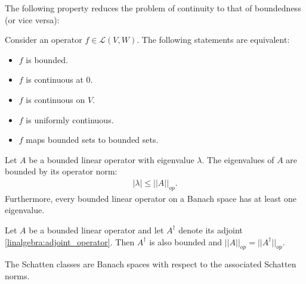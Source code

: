     The following property reduces the problem of continuity to that of boundedness (or vice versa):
    \begin{property}\label{operator:bounded_continuous}
        Consider an operator $f\in\mathcal{L}(V, W)$. The following statements are equivalent:
        \begin{itemize}
            \item $f$ is bounded.
            \item $f$ is continuous at 0.
            \item $f$ is continuous on $V$.
            \item $f$ is uniformly continuous.
            \item $f$ maps bounded sets to bounded sets.
        \end{itemize}
    \end{property}

    \begin{property}
        Let $A$ be a bounded linear operator with eigenvalue $\lambda$. The eigenvalues of $A$ are bounded by its operator norm:
        \begin{gather}
            |\lambda|\leq||A||_{op}.
        \end{gather}
        Furthermore, every bounded linear operator on a Banach space has at least one eigenvalue.
    \end{property}
    \begin{property}
        Let $A$ be a bounded linear operator and let $A^\dag$ denote its adjoint \ref{linalgebra:adjoint_operator}. Then $A^\dag$ is also bounded and $||A||_{op} = ||A^\dag||_{op}$.
    \end{property}

    \begin{property}
        The Schatten classes are Banach spaces with respect to the associated Schatten norms.
    \end{property}

